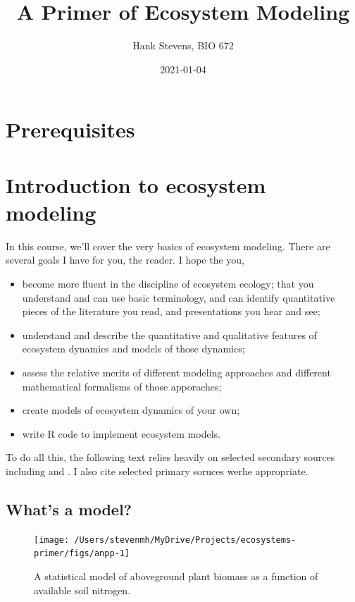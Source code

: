 \documentclass[
]{book}
\title{A Primer of Ecosystem Modeling}
\author{Hank Stevens, BIO 672}
\date{2021-01-04}
\providecommand{\tightlist}{%
  \setlength{\itemsep}{0pt}\setlength{\parskip}{0pt}}
\begin{document}
\maketitle

{
\setcounter{tocdepth}{1}
\tableofcontents
}
\hypertarget{prerequisites}{%
\chapter{Prerequisites}\label{prerequisites}}

\hypertarget{intro}{%
\chapter{Introduction to ecosystem modeling}\label{intro}}

In this course, we'll cover the very basics of ecosystem modeling. There are several goals I have for you, the reader. I hope the you,

\begin{itemize}
\tightlist
\item
  become more fluent in the discipline of ecosystem ecology; that you understand and can use basic terminology, and can identify quantitative pieces of the literature you read, and presentations you hear and see;
\item
  understand and describe the quantitative and qualitative features of ecosystem dynamics and models of those dynamics;
\item
  assess the relative merits of different modeling approaches and different mathematical formalisms of those apporaches;
\item
  create models of ecosystem dynamics of your own;
\item
  write R code to implement ecosystem models.
\end{itemize}

To do all this, the following text relies heavily on selected secondary sources including \citet{Soetaert2009} and \citet{Haefner1996}. I also cite selected primary soruces werhe appropriate.

\hypertarget{whats-a-model}{%
\section{What's a model?}\label{whats-a-model}}

\begin{figure}
\texttt{[image: /Users/stevenmh/MyDrive/Projects/ecosystems-primer/figs/anpp-1]} \caption{A statistical model of aboveground plant biomass as a function of available soil nitrogen.}\label{fig:anpp}
\end{figure}
\end{document}
